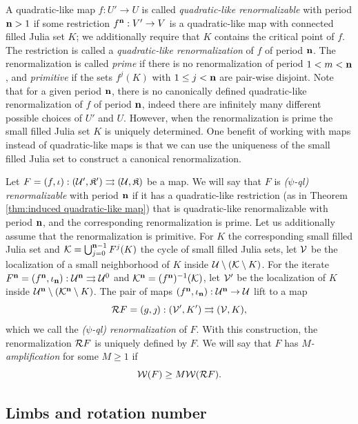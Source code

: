 \documentclass[12pt]{amsart}
\begin{document}
A quadratic-like map $f: U'\to U$ is called \textit{quadratic-like renormalizable}  with period $\mathbf{n}> 1$ if some restriction $f^{\mathbf{n}}: V'\to V$ is a quadratic-like map with connected filled Julia set $K$; we additionally require that $K$ contains the critical point of $f$.
The restriction is called a \textit{quadratic-like renormalization} of $f$ of period $\mathbf{n}$. 
The renormalization is called \textit{prime} if there 
is no renormalization of period $1< m < \mathbf{n}$, and \textit{primitive} if the sets $f^j(K)$ with $1\leq j < \mathbf{n}$ are pair-wise disjoint.
Note that for a given period $\mathbf{n}$, there is no canonically defined quadratic-like renormalization of $f$ of period $\mathbf{n}$, indeed there are infinitely many different possible choices of $U'$ and $U$. However, when the renormalization is prime the small filled Julia set $K$ is uniquely determined. One benefit of  working with \pql maps instead of quadratic-like maps is that
we can use the uniqueness of the small filled Julia set to construct a canonical renormalization.


Let $F= (f, \iota): (\mathcal U', \mathfrak{K}')\rightrightarrows (\mathcal U, \mathfrak{K})$ be a \pql map. We will say that $F$ is \textit{($\psi$-ql) renormalizable} with period $\mathbf{n}$ if it has a quadratic-like restriction (as in Theorem \ref{thm:induced quadratic-like map}) that is quadratic-like renormalizable with period $\mathbf{n}$, and the corresponding renormalization is prime. Let us additionally assume that the renormalization is primitive.
For $K$ the  corresponding small filled Julia set and $\mathcal K = \bigcup_{j=0}^{\mathbf{n}-1}F^j(K)$ the cycle of small filled Julia sets, 
let $\mathcal V$ be the localization of a small neighborhood of $K$ inside $\mathcal U\setminus (\mathcal K\setminus K)$. 
For the iterate $F^{\mathbf{n}} = (f^{\mathbf{n}}, \iota_{\mathbf{n}}): \mathcal U^{\mathbf{n}}\rightrightarrows \mathcal U^0$ and $\mathcal K^{\mathbf{n}} = (f^{\mathbf{n}})^{-1}(\mathcal K)$, let $\mathcal V'$ be the localization of $K$ inside  $\mathcal U^{\mathbf{n}}\setminus (\mathcal K^{\mathbf{n}}\setminus K)$.
The pair of maps $(f^{\mathbf{n}}, \iota_{\mathbf{n}}): \mathcal U^{\mathbf{n}}\to \mathcal U$ lift to a \pql map $$\mathcal R F= (g, \jmath): (\mathcal V', K') \rightrightarrows (\mathcal V, K),$$ which we call the \textit{($\psi$-ql) renormalization}  of $F$.
With this construction, the renormalization $\mathcal R F$ is uniquely defined by $F$. We will say that $F$ has \textit{$M$-amplification}  for some $M\geq 1$ if 
$$\mathcal W(F)\geq M \mathcal W(\mathcal R F).$$


\subsection{Limbs and rotation number}\label{sec:limbs}
\end{document}
